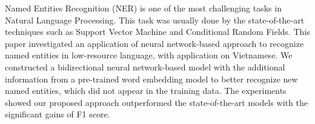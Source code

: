 Named Entities Recognition (NER) is one of the most challenging tasks in Natural Language Processing. This task was usually done by the state-of-the-art techniques such as Support Vector Machine and Conditional Random Fields. This paper investigated an application of neural network-based approach to recognize named entities in low-resource language, with application on Vietnamese. We constructed a bidirectional neural network-based model with the additional information from a pre-trained word embedding model to better recognize new named entities, which did not appear in the training data. The experiments showed our proposed approach outperformed the state-of-the-art models with the significant gains of F1 score.
